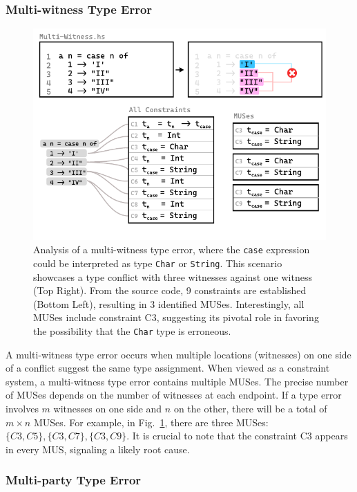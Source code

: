 \documentclass[pdflatex,sn-mathphys-num]{sn-jnl}%
\begin{document}
\subsubsection*{Multi-witness Type Error} 

\begin{figure}[hbt]
    \centering
\includegraphics[width=\linewidth]{images/Multi-Witness-MUS}
  \caption{\label{fig:multi-witness-2}
    Analysis of a multi-witness type error, where the \texttt{case} expression could be interpreted as type \texttt{Char} or \texttt{String}. This scenario showcases a type conflict with three witnesses against one witness (Top Right). From the source code, 9 constraints are established (Bottom Left), resulting in 3 identified MUSes. Interestingly, all MUSes include constraint C3, suggesting its pivotal role in favoring the possibility that the \texttt{Char} type is erroneous.
  }
  \end{figure}

A multi-witness type error occurs when multiple locations (witnesses) on one side of a conflict suggest the same type assignment. When viewed as a constraint system, a multi-witness type error contains multiple MUSes. The precise number of MUSes depends on the number of witnesses at each endpoint. If a type error involves $m$ witnesses on one side and $n$ on the other, there will be a total of $m \times n$ MUSes. For example, in Fig.~\ref{fig:multi-witness-2}, there are three MUSes: $\{C3, C5\}, \{C3, C7\}, \{C3, C9\}$. It is crucial to note that the constraint C3 appears in every MUS, signaling a likely root cause.

\subsubsection*{Multi-party Type Error}
\end{document}
